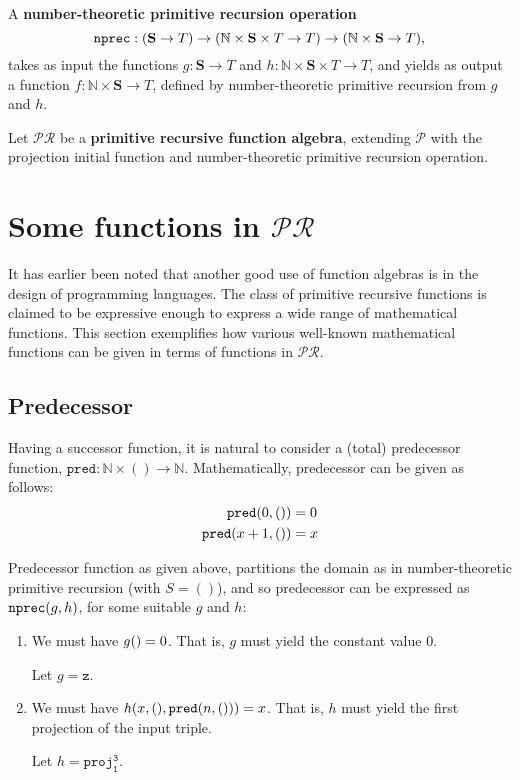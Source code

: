 \begin{definition} A \textbf{number-theoretic primitive recursion operation}
%
$$\mathtt{nprec} : {\mathopen{}\left({\mathbf{S} \rightarrow T}\right)\mathclose{}} \rightarrow {\ensuremath{\mathopen{}\left({\mathbb{N}
\times \mathbf{S} \times T \rightarrow T}\right)\mathclose{}}} \rightarrow {\ensuremath{\mathopen{}\left({\mathbb{N} \times
\mathbf{S} \rightarrow T}\right)\mathclose{}}},$$
%
takes as input the functions $g : \mathbf{S} \rightarrow T$ and $h : \mathbb{N}
\times \mathbf{S} \times T \rightarrow T$, and yields as output a function $f :
\mathbb{N} \times \mathbf{S} \rightarrow T$, defined by number-theoretic
primitive recursion from $g$ and $h$.\end{definition}

\begin{definition} Let $\mathcal{PR}$ be a \textbf{primitive recursive function
algebra}, extending $\mathcal{P}$ with the projection initial function and
number-theoretic primitive recursion operation.\end{definition}

\section{Some functions in $\mathcal{PR}$}

It has earlier been noted that another good use of function algebras is in the
design of programming languages. The class of primitive recursive functions is
claimed to be expressive enough to express a wide range of mathematical
functions. This section exemplifies how various well-known mathematical
functions can be given in terms of functions in $\mathcal{PR}$.

\subsection{Predecessor}

Having a successor function, it is natural to consider a (total) predecessor
function, $\mathtt{pred} : \mathbb{N} \times () \rightarrow \mathbb{N}$.
Mathematically, predecessor can be given as follows:\begin{align*}
%
\mathtt{pred}\p{0,()} &= 0 \\
%
\mathtt{pred}\p{x+1,()} &= x
%
\end{align*}

Predecessor function as given above, partitions the domain as in
number-theoretic primitive recursion (with $S = ()$), and so predecessor can be
expressed as $\mathtt{nprec}{\mathopen{}\left({g,h}\right)\mathclose{}}$, for some suitable $g$ and $h$:

\begin{enumerate}[label=(\arabic*)]

\item We must have $g{\mathopen{}\left({}\right)\mathclose{}} = 0$. That is, $g$ must yield the constant value $0$.

Let  $g=\mathtt{z}$.

\item We must have $h{\mathopen{}\left({x,(),\mathtt{pred}{\mathopen{}\left({n,()}\right)\mathclose{}}}\right)\mathclose{}}=x$. That is, $h$ must yield
the first projection of the input triple.

Let $h = \mathtt{proj^3_1}$.

\end{enumerate}

